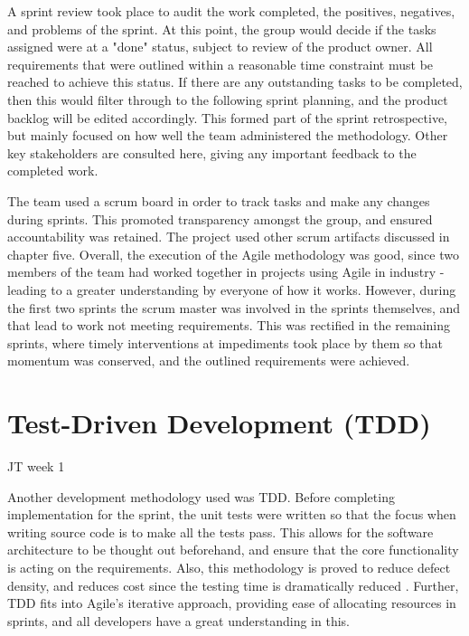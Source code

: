A sprint review took place to audit the work completed, the positives, negatives, and problems of the sprint. At this point, the group would decide if the tasks assigned were at a "done" status, subject to review of the product owner. All requirements that were outlined within a reasonable time constraint must be reached to achieve this status. If there are any outstanding tasks to be completed, then this would filter through to the following sprint planning, and the product backlog will be edited accordingly. This formed part of the sprint retrospective, but mainly focused on how well the team administered the methodology. Other key stakeholders are consulted here, giving any important feedback to the completed work.

The team used a scrum board in order to track tasks and make any changes during sprints. This promoted transparency amongst the group, and ensured accountability was retained. The project used other scrum artifacts discussed in chapter five. Overall, the execution of the Agile methodology was good, since two members of the team had worked together in projects using Agile in industry - leading to a greater understanding by everyone of how it works. However, during the first two sprints the scrum master was involved in the sprints themselves, and that lead to work not meeting requirements. This was rectified in the remaining sprints, where timely interventions at impediments took place by them so that momentum was conserved, and the outlined requirements were achieved.



\section{Test-Driven Development (TDD)}
JT week 1

Another development methodology used was TDD. Before completing implementation for the sprint, the unit tests were written so that the focus when writing source code is to make all the tests pass. This allows for the software architecture to be thought out beforehand, and ensure that the core functionality is acting on the requirements. Also, this methodology is proved to reduce defect density, and reduces cost since the testing time is dramatically reduced \cite{bulajic}. Further, TDD fits into Agile's iterative approach, providing ease of allocating resources in sprints, and all developers have a great understanding in this.

